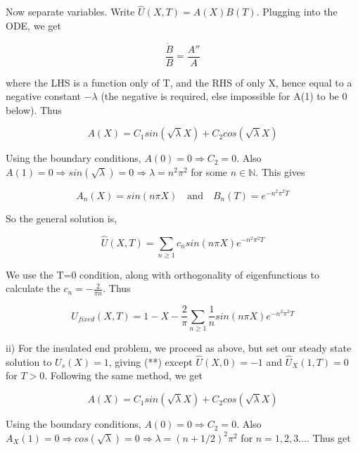 \documentclass[10pt,a4paper]{report}
\begin{document}
Now separate variables. Write $\hat{U}(X,T)=A(X)B(T)$. Plugging into the ODE, we get

\begin{equation*}
\frac{\dot{B}}{B}=\frac{A''}{A}
\end{equation*}

where the LHS is a function only of T, and the RHS of only X, hence equal to a negative constant $-\lambda$ (the negative is required, else impossible for A(1) to be 0 below). Thus 

\begin{equation*}
A(X)=C_1sin(\sqrt{\lambda}X)+C_2cos(\sqrt{\lambda}X)
\end{equation*}

Using the boundary conditions, $A(0)=0\Rightarrow C_2=0$. Also $A(1)=0\Rightarrow sin(\sqrt{\lambda})=0 \Rightarrow \lambda=n^2\pi^2$ for some $n\in\mathbb{N}$. This gives

\begin{equation*}
A_n(X)=sin(n\pi X) \quad \text{and} \quad B_n(T)=e^{-n^2\pi^2 T}
\end{equation*}

So the general solution is,

\begin{equation*}
\hat{U}(X,T)=\sum_{n\geq 1} c_n sin(n\pi X) e^{-n^2\pi^2 T}
\end{equation*}

We use the T=0 condition, along with orthogonality of eigenfunctions to calculate the $c_n=-\frac{2}{\pi n}$. Thus 

\begin{equation*}
U_{fixed}(X,T)=1-X-\frac{2}{\pi}\sum_{n\geq 1} \frac{1}{n}sin(n\pi X) e^{-n^2\pi^2 T}
\end{equation*}

\vspace{1cm}

ii) For the insulated end problem, we proceed as above, but set our steady state solution to $U_s(X)=1$, giving (**) except $\hat{U}(X,0)=-1$ and $\hat{U}_X(1,T)=0$ for $T>0$. Following the same method, we get

\begin{equation*}
A(X)=C_1sin(\sqrt{\lambda}X)+C_2cos(\sqrt{\lambda}X)
\end{equation*}

Using the boundary conditions, $A(0)=0\Rightarrow C_2=0$. Also $A_X(1)=0\Rightarrow cos(\sqrt{\lambda})=0 \Rightarrow \lambda=(n+1/2)^2\pi^2$ for $n=1,2,3...$. Thus get 
\end{document}
